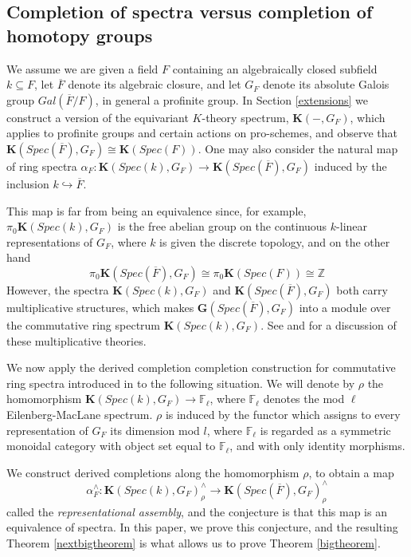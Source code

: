 \documentclass[11pt]{article}
\newcommand\mb{\mathbb}
\def \bG{\mathbf G}
\def \bK{\mathbf K}
\begin{document}
\subsection{Completion of spectra versus completion of homotopy groups}

  
 We assume we are given a field $F$ containing an algebraically closed subfield $k \subseteq F$, let $\overline{F} $ denote its algebraic closure, and let $G_F$ denote its absolute Galois group $Gal(\overline{F} /F)$, in general a profinite group.  In Section \ref{extensions} we construct a version of the equivariant $K$-theory spectrum,  $\bK(-,G_F)$,  which applies to profinite groups and certain actions on pro-schemes, and observe that $\bK(Spec (\overline{F}), G_F) \cong \bK(Spec (F))$.  One may also consider the natural map of ring spectra $\alpha_F : \bK(Spec(k), G_F) \rightarrow 
 \bK(Spec (\overline{F}), G_F)$ induced by the inclusion $k \hookrightarrow \overline{F} $. 
 
 This map is far from being an equivalence since, for example, $\pi _0 \bK(Spec(k), G_F) $ is the free abelian group on the continuous $k$-linear representations of $G_F$, where $k$ is given the discrete topology, and on the other hand 
$$ \pi _0 \bK(Spec(\overline{F}), G_F) \cong \pi _0 \bK(Spec(F)) \cong {\mathbb Z}
$$
However, the spectra $\bK(Spec(k), G_F)$ and $\bK(Spec (\overline{F}), G_F)$ both carry multiplicative structures, which makes $\bG(Spec (\overline{F}), G_F)$ into a module over the commutative ring spectrum $\bK(Spec(k), G_F)$.  See \cite{ekmm} and \cite{symmetric} for a discussion of these multiplicative theories. 

We now apply the derived completion completion construction for commutative ring spectra introduced in \cite{completion} to the following situation.  We will denote by $\rho $ the homomorphism $\bK(Spec(k),G_F) \rightarrow \mb{F}_{\ell} $, where $\mb{F}_{\ell}$ denotes the mod $\ell$ Eilenberg-MacLane spectrum.  $\rho$ is induced by the functor which assigns to every representation of $G_F$ its dimension mod $l$, where $\mb{F}_{\ell} $ is regarded as a symmetric monoidal category with object set equal to $\mb{F}_{\ell} $, and with only identity morphisms.




We  construct derived completions along the homomorphism $\rho $, to obtain a map 
$$\alpha _F^{\wedge} : \bK(Spec(k), G_F)^{\wedge}_{\rho} \rightarrow \bK(Spec(\overline{F}), G_F)^{\wedge}_{\rho }$$
called the {\em representational assembly}, and the conjecture is that this map is an equivalence of spectra. In this paper, we prove this conjecture, and the resulting Theorem \ref{nextbigtheorem} is what allows us to prove Theorem \ref{bigtheorem}. 
\end{document}
